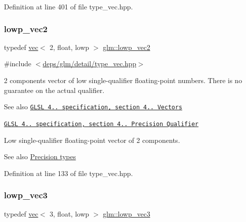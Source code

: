 Definition at line 401 of file type\+\_\+vec.\+hpp.

\mbox{\label{group__core__precision_gaade87cebca8e38717e38c18df8fc9c8a}} 
\subsubsection{\texorpdfstring{lowp\+\_\+vec2}{lowp\_vec2}}
{\footnotesize\ttfamily typedef \hyperlink{structglm_1_1vec}{vec}$<$ 2, float, lowp $>$ \hyperlink{group__core__precision_gaade87cebca8e38717e38c18df8fc9c8a}{glm\+::lowp\+\_\+vec2}}



{\ttfamily \#include $<$\hyperlink{type__vec_8hpp}{deps/glm/detail/type\+\_\+vec.\+hpp}$>$}

2 components vector of low single-\/qualifier floating-\/point numbers. There is no guarantee on the actual qualifier.

\begin{DoxySeeAlso}{See also}
\href{http://www.opengl.org/registry/doc/GLSLangSpec.4.20.8.pdf}{\tt G\+L\+SL 4.. specification, section 4.. Vectors} 

\href{http://www.opengl.org/registry/doc/GLSLangSpec.4.20.8.pdf}{\tt G\+L\+SL 4.. specification, section 4.. Precision Qualifier}
\end{DoxySeeAlso}
Low single-\/qualifier floating-\/point vector of 2 components. \begin{DoxySeeAlso}{See also}
\hyperlink{group__core__precision}{Precision types} 
\end{DoxySeeAlso}


Definition at line 133 of file type\+\_\+vec.\+hpp.

\mbox{\label{group__core__precision_ga185f659de082bad5abfa576891d0612d}} 
\subsubsection{\texorpdfstring{lowp\+\_\+vec3}{lowp\_vec3}}
{\footnotesize\ttfamily typedef \hyperlink{structglm_1_1vec}{vec}$<$ 3, float, lowp $>$ \hyperlink{group__core__precision_ga185f659de082bad5abfa576891d0612d}{glm\+::lowp\+\_\+vec3}}



